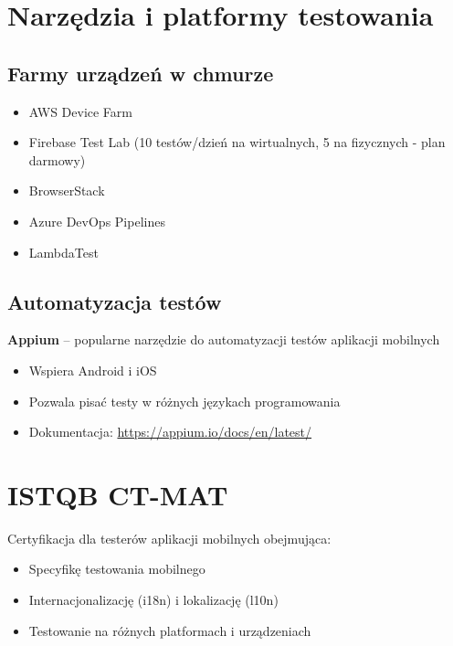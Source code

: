 \section{Narzędzia i platformy testowania}

\subsection{Farmy urządzeń w chmurze}
\begin{itemize}
    \item AWS Device Farm
    \item Firebase Test Lab (10 testów/dzień na wirtualnych, 5 na fizycznych - plan darmowy)
    \item BrowserStack
    \item Azure DevOps Pipelines
    \item LambdaTest
\end{itemize}

\subsection{Automatyzacja testów}
\textbf{Appium} -- popularne narzędzie do automatyzacji testów aplikacji mobilnych
\begin{itemize}
    \item Wspiera Android i iOS
    \item Pozwala pisać testy w różnych językach programowania
    \item Dokumentacja: \url{https://appium.io/docs/en/latest/}
\end{itemize}

\section{ISTQB CT-MAT}
Certyfikacja dla testerów aplikacji mobilnych obejmująca:
\begin{itemize}
    \item Specyfikę testowania mobilnego
    \item Internacjonalizację (i18n) i lokalizację (l10n)
    \item Testowanie na różnych platformach i urządzeniach
\end{itemize}

